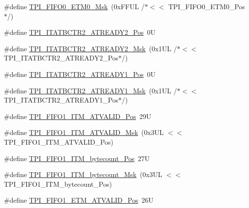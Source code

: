 \begin{DoxyCompactItemize}
\item 
\#define \mbox{\hyperlink{group___c_m_s_i_s___t_p_i_gaf924f7d1662f3f6c1da12052390cb118}{T\+P\+I\+\_\+\+F\+I\+F\+O0\+\_\+\+E\+T\+M0\+\_\+\+Msk}}~(0x\+F\+F\+U\+L /$\ast$$<$$<$ T\+P\+I\+\_\+\+F\+I\+F\+O0\+\_\+\+E\+T\+M0\+\_\+\+Pos$\ast$/)
\item 
\#define \mbox{\hyperlink{group___c_m_s_i_s___t_p_i_ga36b77b6a6a9808dec534802232ffcaa4}{T\+P\+I\+\_\+\+I\+T\+A\+T\+B\+C\+T\+R2\+\_\+\+A\+T\+R\+E\+A\+D\+Y2\+\_\+\+Pos}}~0U
\item 
\#define \mbox{\hyperlink{group___c_m_s_i_s___t_p_i_gaef520d45da3808f8ffde92b915cd6c7c}{T\+P\+I\+\_\+\+I\+T\+A\+T\+B\+C\+T\+R2\+\_\+\+A\+T\+R\+E\+A\+D\+Y2\+\_\+\+Msk}}~(0x1\+U\+L /$\ast$$<$$<$ T\+P\+I\+\_\+\+I\+T\+A\+T\+B\+C\+T\+R2\+\_\+\+A\+T\+R\+E\+A\+D\+Y2\+\_\+\+Pos$\ast$/)
\item 
\#define \mbox{\hyperlink{group___c_m_s_i_s___t_p_i_gae0edc53203a2373fef7734be91e6125a}{T\+P\+I\+\_\+\+I\+T\+A\+T\+B\+C\+T\+R2\+\_\+\+A\+T\+R\+E\+A\+D\+Y1\+\_\+\+Pos}}~0U
\item 
\#define \mbox{\hyperlink{group___c_m_s_i_s___t_p_i_ga32573fb2508a35660ab785a85c5b38a7}{T\+P\+I\+\_\+\+I\+T\+A\+T\+B\+C\+T\+R2\+\_\+\+A\+T\+R\+E\+A\+D\+Y1\+\_\+\+Msk}}~(0x1\+U\+L /$\ast$$<$$<$ T\+P\+I\+\_\+\+I\+T\+A\+T\+B\+C\+T\+R2\+\_\+\+A\+T\+R\+E\+A\+D\+Y1\+\_\+\+Pos$\ast$/)
\item 
\#define \mbox{\hyperlink{group___c_m_s_i_s___t_p_i_ga08edfc862b2c8c415854cc4ae2067dfb}{T\+P\+I\+\_\+\+F\+I\+F\+O1\+\_\+\+I\+T\+M\+\_\+\+A\+T\+V\+A\+L\+I\+D\+\_\+\+Pos}}~29U
\item 
\#define \mbox{\hyperlink{group___c_m_s_i_s___t_p_i_gabc1f6a3b6cac0099d7c01ca949b4dd08}{T\+P\+I\+\_\+\+F\+I\+F\+O1\+\_\+\+I\+T\+M\+\_\+\+A\+T\+V\+A\+L\+I\+D\+\_\+\+Msk}}~(0x3\+U\+L $<$$<$ T\+P\+I\+\_\+\+F\+I\+F\+O1\+\_\+\+I\+T\+M\+\_\+\+A\+T\+V\+A\+L\+I\+D\+\_\+\+Pos)
\item 
\#define \mbox{\hyperlink{group___c_m_s_i_s___t_p_i_gaa22ebf7c86e4f4b2c98cfd0b5981375a}{T\+P\+I\+\_\+\+F\+I\+F\+O1\+\_\+\+I\+T\+M\+\_\+bytecount\+\_\+\+Pos}}~27U
\item 
\#define \mbox{\hyperlink{group___c_m_s_i_s___t_p_i_gacba2edfc0499828019550141356b0dcb}{T\+P\+I\+\_\+\+F\+I\+F\+O1\+\_\+\+I\+T\+M\+\_\+bytecount\+\_\+\+Msk}}~(0x3\+U\+L $<$$<$ T\+P\+I\+\_\+\+F\+I\+F\+O1\+\_\+\+I\+T\+M\+\_\+bytecount\+\_\+\+Pos)
\item 
\#define \mbox{\hyperlink{group___c_m_s_i_s___t_p_i_ga3177b8d815cf4a707a2d3d3d5499315d}{T\+P\+I\+\_\+\+F\+I\+F\+O1\+\_\+\+E\+T\+M\+\_\+\+A\+T\+V\+A\+L\+I\+D\+\_\+\+Pos}}~26U

\end{DoxyCompactItemize}
